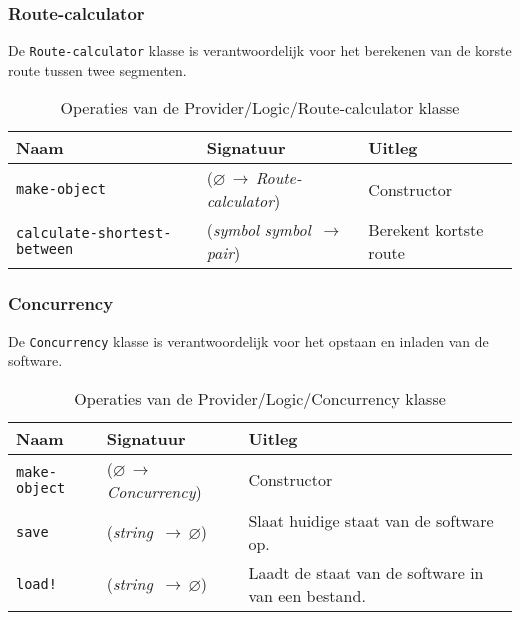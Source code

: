 \documentclass[a4paper, 11pt]{article}
\newcommand{\naar}{\,$\rightarrow$\,}
\renewcommand{\empty}{$\varnothing$}
\newcommand{\<}{\scriptsize\textless\normalsize}
\renewcommand{\>}{\scriptsize\textgreater\normalsize}
\begin{document}
\subsubsection{Route-calculator} %
De \texttt{Route-calculator} klasse is verantwoordelijk voor het berekenen van de korste route tussen twee segmenten.
\begin{table}[H]
	\begin{center}
		{
			\begin{tabular}{|l l l|}
				\hline
				\textbf{Naam} & \textbf{Signatuur} & \textbf{Uitleg}\\
				\hline
				\texttt{make-object} & (\empty \naar \textit{Route-calculator}) & Constructor\\
				\hline
				\texttt{calculate-shortest-between} & (\textit{symbol} \textit{symbol} \naar \textit{pair}) & Berekent kortste route\\
				\hline
		\end{tabular}}
		\caption{Operaties van de Provider/Logic/Route-calculator klasse}
	\end{center}
\end{table}

\newpage

\subsubsection{Concurrency} %
De \texttt{Concurrency} klasse is verantwoordelijk voor het opstaan en inladen van de software.
\begin{table}[H]
	\begin{center}
		{
			\begin{tabular}{|l l l|}
				\hline
				\textbf{Naam} & \textbf{Signatuur} & \textbf{Uitleg}\\
				\hline
				\texttt{make-object} & (\empty \naar \textit{Concurrency}) & Constructor\\
				\hline
				\texttt{save} & (\textit{string} \naar \empty) & Slaat huidige staat van de software op.\\
				\texttt{load!} & (\textit{string} \naar \empty) & Laadt de staat van de software in van een bestand.\\
				\hline
		\end{tabular}}
		\caption{Operaties van de Provider/Logic/Concurrency klasse}
	\end{center}
\end{table}
\end{document}
